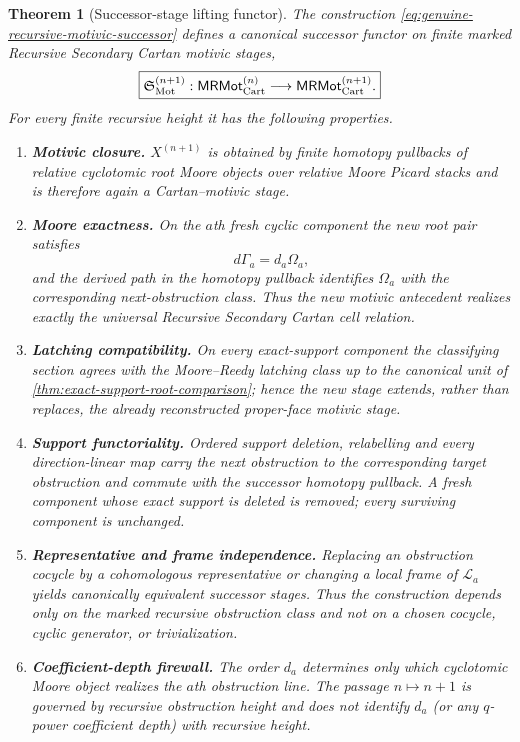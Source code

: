 \documentclass[11pt]{article}
\newtheorem{theorem}{Theorem}[section]
\theoremstyle{remark}
\newcommand{\Mot}{\mathrm{Mot}}
\begin{document}
\begin{theorem}[Successor-stage lifting functor]
\label{thm:genuine-successor-stage-motivic-functor}
The construction \eqref{eq:genuine-recursive-motivic-successor} defines a canonical
successor functor on finite marked Recursive Secondary Cartan motivic stages,
\[
 \boxed{
 \mathfrak S_{\Mot}^{(n+1)}:
 \mathsf{MRMot}^{(n)}_{\rm Cart}
 \longrightarrow
 \mathsf{MRMot}^{(n+1)}_{\rm Cart}.}
\]
For every finite recursive height it has the following properties.
\begin{enumerate}[label=\textup{(\roman*)}]
\item \textbf{Motivic closure.}  $X^{(n+1)}$ is obtained by finite homotopy pullbacks
      of relative cyclotomic root Moore objects over relative Moore Picard stacks and is
      therefore again a Cartan--motivic stage.
\item \textbf{Moore exactness.}  On the $a$th fresh cyclic component the new root pair
      satisfies
      \[
       d\Gamma_a=d_a\Omega_a,
      \]
      and the derived path in the homotopy pullback identifies $\Omega_a$ with the
      corresponding next-obstruction class.  Thus the new motivic antecedent realizes
      exactly the universal Recursive Secondary Cartan cell relation.
\item \textbf{Latching compatibility.}  On every exact-support component the classifying
      section agrees with the Moore--Reedy latching class up to the canonical unit of
      \cref{thm:exact-support-root-comparison}; hence the new stage extends, rather than
      replaces, the already reconstructed proper-face motivic stage.
\item \textbf{Support functoriality.}  Ordered support deletion, relabelling and every
      direction-linear map carry the next obstruction to the corresponding target
      obstruction and commute with the successor homotopy pullback.  A fresh component
      whose exact support is deleted is removed; every surviving component is unchanged.
\item \textbf{Representative and frame independence.}  Replacing an obstruction cocycle
      by a cohomologous representative or changing a local frame of $\mathscr L_a$ yields
      canonically equivalent successor stages.  Thus the construction depends only on
      the marked recursive obstruction class and not on a chosen cocycle, cyclic
      generator, or trivialization.
\item \textbf{Coefficient-depth firewall.}  The order $d_a$ determines only which
      cyclotomic Moore object realizes the $a$th obstruction line.  The passage
      $n\mapsto n+1$ is governed by recursive obstruction height and does not identify
      $d_a$ (or any $q$-power coefficient depth) with recursive height.
\end{enumerate}
\end{theorem}
\end{document}
